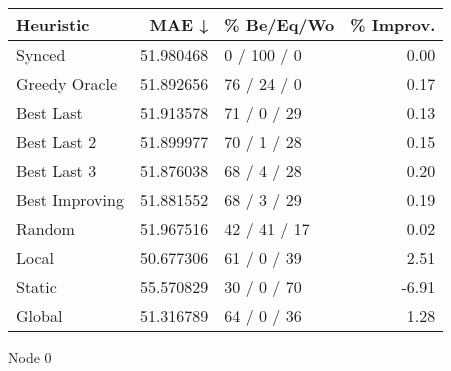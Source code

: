 \begin{tabular}{lrlr}
\toprule
      Heuristic &      MAE ↓ &    \% Be/Eq/Wo & \% Improv. \\
\midrule
         Synced &  51.980468 &   0 / 100 / 0 &      0.00 \\
  Greedy Oracle &  51.892656 &   76 / 24 / 0 &      0.17 \\
      Best Last &  51.913578 &   71 / 0 / 29 &      0.13 \\
    Best Last 2 &  51.899977 &   70 / 1 / 28 &      0.15 \\
    Best Last 3 &  51.876038 &   68 / 4 / 28 &      0.20 \\
 Best Improving &  51.881552 &   68 / 3 / 29 &      0.19 \\
         Random &  51.967516 &  42 / 41 / 17 &      0.02 \\
          Local &  50.677306 &   61 / 0 / 39 &      2.51 \\
         Static &  55.570829 &   30 / 0 / 70 &     -6.91 \\
         Global &  51.316789 &   64 / 0 / 36 &      1.28 \\
\bottomrule
\end{tabular}
\caption{Node 0}
\label{tab:non_lr001_le1_bs2_0}
